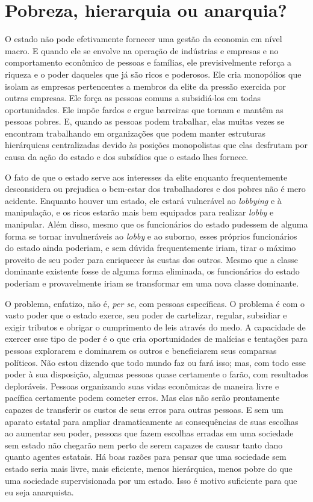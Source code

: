 \section{Pobreza, hierarquia ou anarquia?}

O estado não pode efetivamente fornecer uma gestão da economia em nível macro. E quando ele se envolve na operação de indústrias e empresas e no comportamento econômico de pessoas e famílias, ele previsivelmente reforça a riqueza e o poder daqueles que já são ricos e poderosos. Ele cria monopólios que isolam as empresas pertencentes a membros da elite da pressão exercida por outras empresas. Ele força as pessoas comuns a subsidiá-los em todas oportunidades. Ele impõe fardos e ergue barreiras que tornam e mantêm as pessoas pobres. E, quando as pessoas podem trabalhar, elas muitas vezes se encontram trabalhando em organizações que podem manter estruturas hierárquicas centralizadas devido às posições monopolistas que elas desfrutam por causa da ação do estado e dos subsídios que o estado lhes fornece.

O fato de que o estado serve aos interesses da elite enquanto frequentemente desconsidera ou prejudica o bem-estar dos trabalhadores e dos pobres não é mero acidente. Enquanto houver um estado, ele estará vulnerável ao \emph{lobbying} e à manipulação, e os ricos estarão mais bem equipados para realizar \emph{lobby} e manipular. Além disso, mesmo que os funcionários do estado pudessem de alguma forma se tornar invulneráveis ao \emph{lobby} e ao suborno, esses próprios funcionários do estado ainda poderiam, e sem dúvida frequentemente iriam, tirar o máximo proveito de seu poder para enriquecer às custas dos outros. Mesmo que a classe dominante existente fosse de alguma forma eliminada, os funcionários do estado poderiam e provavelmente iriam se transformar em uma nova classe dominante.

O problema, enfatizo, não é, \emph{per se}, com pessoas específicas. O problema é com o vasto poder que o estado exerce, seu poder de cartelizar, regular, subsidiar e exigir tributos e obrigar o cumprimento de leis através do medo. A capacidade de exercer esse tipo de poder é o que cria oportunidades de malícias e tentações para pessoas explorarem e dominarem os outros e beneficiarem seus comparsas políticos. Não estou dizendo que todo mundo faz ou fará isso; mas, com todo esse poder à sua disposição, algumas pessoas quase certamente o farão, com resultados deploráveis. Pessoas organizando suas vidas econômicas de maneira livre e pacífica certamente podem cometer erros. Mas elas não serão prontamente capazes de transferir os custos de seus erros para outras pessoas. E sem um aparato estatal para ampliar dramaticamente as consequências de suas escolhas ao aumentar seu poder, pessoas que fazem escolhas erradas em uma sociedade sem estado não chegarão nem perto de serem capazes de causar tanto dano quanto agentes estatais. Há boas razões para pensar que uma sociedade sem estado seria mais livre, mais eficiente, menos hierárquica, menos pobre do que uma sociedade supervisionada por um estado. Isso é motivo suficiente para que eu seja anarquista.